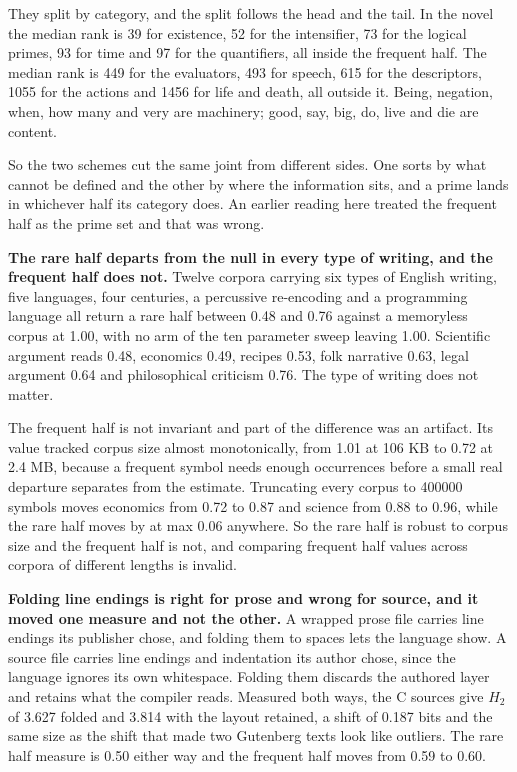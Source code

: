 They split by category, and the split follows the head and the tail. In the novel the median rank is 39 for existence, 52 for the intensifier, 73 for the logical primes, 93 for time and 97 for the quantifiers, all inside the frequent half. The median rank is 449 for the evaluators, 493 for speech, 615 for the descriptors, 1055 for the actions and 1456 for life and death, all outside it. Being, negation, when, how many and very are machinery; good, say, big, do, live and die are content.

So the two schemes cut the same joint from different sides. One sorts by what cannot be defined and the other by where the information sits, and a prime lands in whichever half its category does. An earlier reading here treated the frequent half as the prime set and that was wrong.

\textbf{The rare half departs from the null in every type of writing, and the frequent half does not.} Twelve corpora carrying six types of English writing, five languages, four centuries, a percussive re-encoding and a programming language all return a rare half between 0.48 and 0.76 against a memoryless corpus at 1.00, with no arm of the ten parameter sweep leaving 1.00. Scientific argument reads 0.48, economics 0.49, recipes 0.53, folk narrative 0.63, legal argument 0.64 and philosophical criticism 0.76. The type of writing does not matter.

The frequent half is not invariant and part of the difference was an artifact. Its value tracked corpus size almost monotonically, from 1.01 at 106 KB to 0.72 at 2.4 MB, because a frequent symbol needs enough occurrences before a small real departure separates from the estimate. Truncating every corpus to 400000 symbols moves economics from 0.72 to 0.87 and science from 0.88 to 0.96, while the rare half moves by at max 0.06 anywhere. So the rare half is robust to corpus size and the frequent half is not, and comparing frequent half values across corpora of different lengths is invalid.

\textbf{Folding line endings is right for prose and wrong for source, and it moved one measure and not the other.} A wrapped prose file carries line endings its publisher chose, and folding them to spaces lets the language show. A source file carries line endings and indentation its author chose, since the language ignores its own whitespace. Folding them discards the authored layer and retains what the compiler reads. Measured both ways, the C sources give \(H_2\) of 3.627 folded and 3.814 with the layout retained, a shift of 0.187 bits and the same size as the shift that made two Gutenberg texts look like outliers. The rare half measure is 0.50 either way and the frequent half moves from 0.59 to 0.60.

